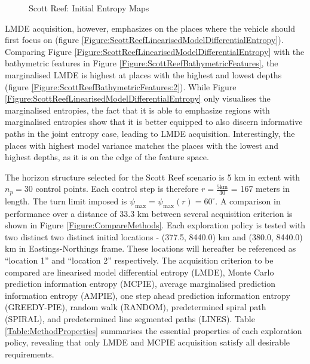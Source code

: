 			\begin{figure}[!htbp]
			\centering
			\caption{Scott Reef: Initial Entropy Maps}
			\label{Figure:InitialEntropyMaps}
			\end{figure}
			
			LMDE acquisition, however, emphasizes on the places where the vehicle should first focus on (figure \ref{Figure:ScottReefLinearisedModelDifferentialEntropy}). Comparing Figure \ref{Figure:ScottReefLinearisedModelDifferentialEntropy} with the bathymetric features in Figure \ref{Figure:ScottReefBathymetricFeatures}, the marginalised LMDE is highest at places with the highest and lowest depths (figure \ref{Figure:ScottReefBathymetricFeatures:2}). While Figure \ref{Figure:ScottReefLinearisedModelDifferentialEntropy} only visualises the marginalised entropies, the fact that it is able to emphasize regions with marginalised entropies show that it is better equipped to also discern informative paths in the joint entropy case, leading to LMDE acquisition. Interestingly, the places with highest model variance matches the places with the lowest and highest depths, as it is on the edge of the feature space.
		
			The horizon structure selected for the Scott Reef scenario is 5 km in extent with $n_{p} = 30$ control points. Each control step is therefore $r = \frac{5 \mathrm{km}}{30}$ = 167 meters in length. The turn limit imposed is $\psi_{\mathrm{max}} = \psi_{\mathrm{max}}(r) = 60^{\circ}$. A comparison in performance over a distance of 33.3 km between several acquisition criterion is shown in Figure \ref{Figure:CompareMethods}. Each exploration policy is tested with two distinct two distinct initial locations - (377.5, 8440.0) km and (380.0, 8440.0) km in Eastings-Northings frame. These locations will hereafter be referenced as ``location 1'' and ``location 2'' respectively. The acquisition criterion to be compared are linearised model differential entropy (LMDE), Monte Carlo prediction information entropy (MCPIE), average marginalised prediction information entropy (AMPIE), one step ahead prediction information entropy (GREEDY-PIE), random walk (RANDOM), predetermined spiral path (SPIRAL), and predetermined line segmented paths (LINES). Table \ref{Table:MethodProperties} summarises the essential properties of each exploration policy, revealing that only LMDE and MCPIE acquisition satisfy all desirable requirements.
		
